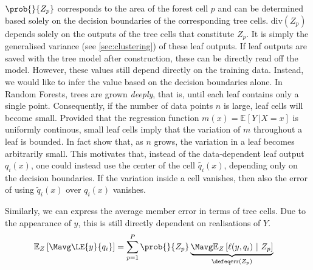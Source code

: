 \documentclass[
    a4paper, %
	fontsize=10pt, %
	twoside=false, %
]{kaobook}
\begin{document}
$\prob{}{Z_{p}}$ corresponds to the area of the forest cell $p$ and can be determined based solely on the decision boundaries of the corresponding tree cells.
$\text{div}(Z_{p})$ depends solely on the outputs of the tree cells that constitute $Z_{p}$. It is simply the generalised variance (see \ref{sec:clustering}) of these leaf outputs. If leaf outputs are saved with the tree model after construction, these can be directly read off the model. However, these values still depend directly on the training data. Instead, we would like to infer the value based on the decision boundaries alone.
In Random Forests, trees are grown \textit{deeply}, that is, until each leaf contains only a single point. Consequently, if the number of data points $n$ is large, leaf cells will become small. Provided that the regression function $m(x) = \mathbb{E}_{}\left[ Y ~| X=x \right]$ is uniformly continous, small leaf cells imply that the variation of $m$ throughout a leaf is bounded. 
In fact \cite{scornet} show
that, as $n$ grows, the variation in a leaf becomes arbitrarily small.
This motivates that, instead of the data-dependent leaf output $q_{i}(x)$, one could instead use the center of the cell $\tilde{q_{i}}(x)$, depending only on the decision boundaries. If the variation inside a cell vanishes, then also the error of using $\tilde{q}_{i}(x)$ over $q_{i}(x)$ vanishes.

Similarly, we can express the average member error in terms of tree cells. Due to the appearance of $y$, this is still directly dependent on realisations of $Y$.
\begin{align*}
\mathbb{E}_{Z}\left[ \Mavg \LE{y}{q_{i}} \right] &= \sum_{p=1}^P \prob{}{Z_{p}}  
\underbrace{
\Mavg \mathbb{E}_{Z}\left[ \ell(y, q_{i} ) ~|~Z_{p} \right]  
}_{\defeq  \text{err}(Z_{p}) }
\end{align*}
\end{document}
